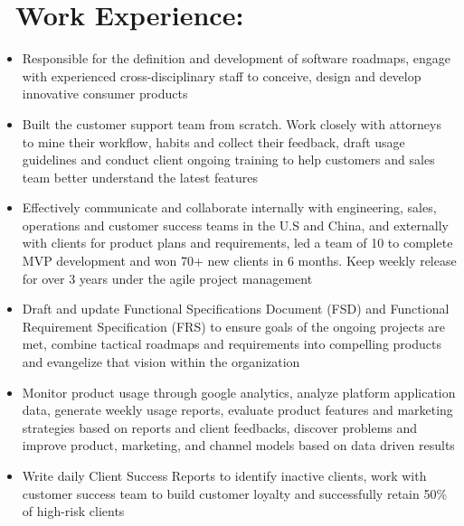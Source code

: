 \documentclass{resume}
\begin{document}
\section{%
        \texorpdfstring{\faUsers\ Work Experience:}%
                        {-{}--Work Experience}}
\begin{itemize}
  \item Responsible for the definition and development of software roadmaps, engage with experienced cross-disciplinary staff to conceive, design and develop innovative consumer products
  \item Built the customer support team from scratch. Work closely with attorneys to mine their workflow, habits and collect their feedback, draft usage guidelines and conduct client ongoing training to help customers and sales team better understand the latest features
  \item Effectively communicate and collaborate internally with engineering, sales, operations and customer success teams in the U.S and China, and externally with clients for product plans and requirements, led a team of 10 to complete MVP development and won 70+ new clients in 6 months. Keep weekly release for over 3 years under the agile project management
  \item Draft and update Functional Specifications Document (FSD) and Functional Requirement Specification (FRS) to ensure goals of the ongoing projects are met, combine tactical roadmaps and requirements into compelling products and evangelize that vision within the organization
  \item Monitor product usage through google analytics, analyze platform application data, generate weekly usage reports, evaluate product features and marketing strategies based on reports and client feedbacks, discover problems and improve product, marketing, and channel models based on data driven results
  \item Write daily Client Success Reports to identify inactive clients, work with customer success team to build customer loyalty and successfully retain 50\% of high-risk clients
\end{itemize}
\end{document}
